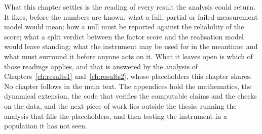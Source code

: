 What this chapter settles is the reading of every result the analysis could
return. It fixes, before the numbers are known, what a full, partial or failed
measurement model would mean; how a null must be reported against the
reliability of the score; what a split verdict between the factor score and the
realisation model would leave standing; what the instrument may be used for in
the meantime; and what must surround it before anyone acts on it. What it leaves
open is which of those readings applies, and that is answered by the analysis of
Chapters~\ref{ch:results1} and~\ref{ch:results2}, whose placeholders this
chapter shares. No chapter follows in the main text. The appendices hold the
mathematics, the dynamical extension, the code that verifies the computable
claims and the checks on the data, and the next piece of work lies outside the
thesis: running the analysis that fills the placeholders, and then testing the
instrument in a population it has not seen.

